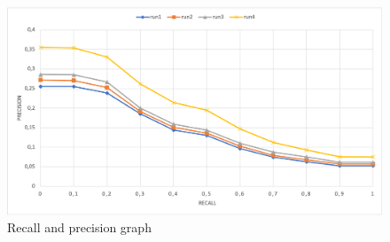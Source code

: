 \begin{figure}[h!]
    \includegraphics[width=\textwidth]{figure/rp_eng.png}
    \caption{Recall and precision graph}
    \label{fig:rp_english}
  \end{figure}